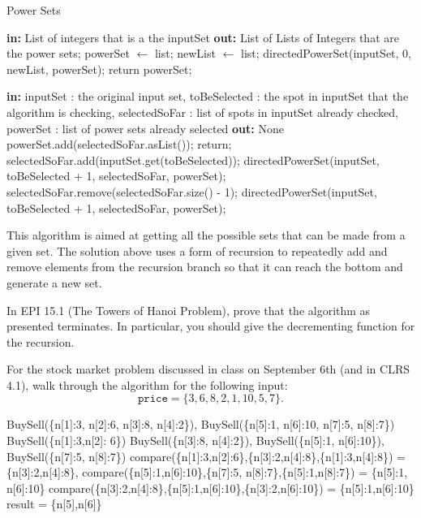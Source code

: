 \documentclass{article}
\begin{document}
  	\begin{algorithm}
	\caption{Power Sets}\label{power sets}
        \begin{algorithmic}[1]
		 \State \textbf{in:} List of integers that is a the inputSet
		 \State \textbf{out: } List of Lists of Integers that are the power sets;  
		 \State powerSet $\gets$ list;
		 \State newList $\gets$ list;
		 \State directedPowerSet(inputSet, 0, newList, powerSet);
		 \State return powerSet;
		 \EndProcedure
		 
		 	\State \textbf{in:} inputSet : the original input set, toBeSelected : the spot in inputSet that the algorithm is checking, selectedSoFar : list of spots in inputSet already checked, powerSet : list of power sets already selected
			\State \textbf{out: } None
				\State powerSet.add(selectedSoFar.asList());
				\State return;
			\EndIf
			\State selectedSoFar.add(inputSet.get(toBeSelected)); 
			\State directedPowerSet(inputSet, toBeSelected + 1, selectedSoFar, powerSet);
			\State selectedSoFar.remove(selectedSoFar.size() - 1);
			\State directedPowerSet(inputSet, toBeSelected + 1, selectedSoFar, powerSet);
		 \EndProcedure
	\end{algorithmic}
	\end{algorithm}

This algorithm is aimed at getting all the possible sets that can be made from a given set. The solution above uses a form of recursion to repeatedly add and remove elements from the recursion branch so that it can reach the bottom and generate a new set.

\nextprob
In EPI 15.1 (The Towers of Hanoi Problem), prove that the algorithm as presented
terminates.  In particular, you should give the decrementing function for the
recursion.

\nextprob
For the stock market problem discussed in class on September 6th (and in CLRS
4.1), walk through
the algorithm for the following input:
$$\mathtt{price} = \{ 3, 6, 8, 2, 1, 10, 5, 7 \}. $$

BuySell(\{n[1]:3, n[2]:6, n[3]:8, n[4]:2\}), BuySell(\{n[5]:1, n[6]:10, n[7]:5, n[8]:7\})\newline
BuySell(\{n[1]:3,n[2]: 6\}) BuySell(\{n[3]:8, n[4]:2\}), BuySell(\{n[5]:1, n[6]:10\}), BuySell(\{n[7]:5, n[8]:7\})\newline
compare(\{n[1]:3,n[2]:6\},\{n[3]:2,n[4]:8\},\{n[1]:3,n[4]:8\}) = \{n[3]:2,n[4]:8\}, compare(\{n[5]:1,n[6]:10\},\{n[7]:5, n[8]:7\},\{n[5]:1,n[8]:7\}) = \{n[5]:1, n[6]:10\}\newline
compare(\{n[3]:2,n[4]:8\},\{n[5]:1,n[6]:10\},\{n[3]:2,n[6]:10\}) = \{n[5]:1,n[6]:10\}\newline
result = \{n[5],n[6]\}
\end{document}
